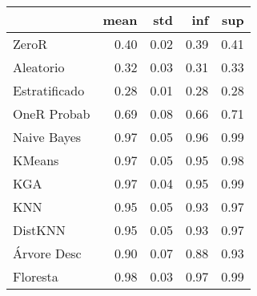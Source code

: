 \begin{table}
\centering
\label{Wine_status_table}
\begin{tabular}{lrrrr}
\toprule
{} &  mean &  std &  inf &  sup \\
\midrule
ZeroR         &  0.40 & 0.02 & 0.39 & 0.41 \\
Aleatorio     &  0.32 & 0.03 & 0.31 & 0.33 \\
Estratificado &  0.28 & 0.01 & 0.28 & 0.28 \\
OneR Probab   &  0.69 & 0.08 & 0.66 & 0.71 \\
Naive Bayes   &  0.97 & 0.05 & 0.96 & 0.99 \\
KMeans        &  0.97 & 0.05 & 0.95 & 0.98 \\
KGA           &  0.97 & 0.04 & 0.95 & 0.99 \\
KNN           &  0.95 & 0.05 & 0.93 & 0.97 \\
DistKNN       &  0.95 & 0.05 & 0.93 & 0.97 \\
Árvore Desc   &  0.90 & 0.07 & 0.88 & 0.93 \\
Floresta      &  0.98 & 0.03 & 0.97 & 0.99 \\
\bottomrule
\end{tabular}
\end{table}
